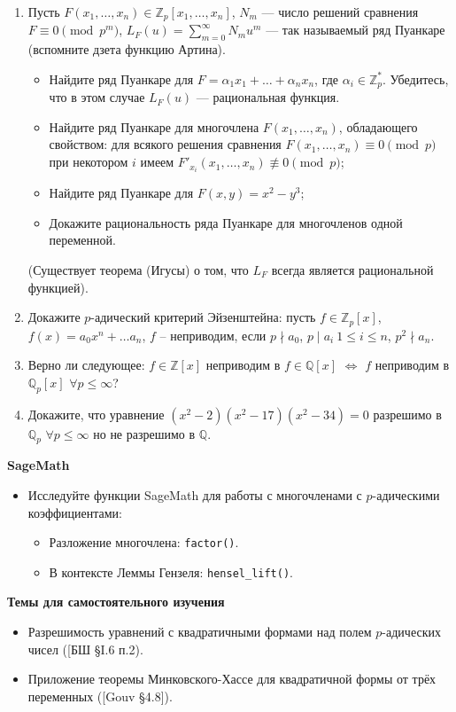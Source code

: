 \begin{enumerate}[topsep=0pt]
    \item Пусть $F(x_1,\dots, x_n) \in \mathbb{Z}_p[x_1,\dots, x_n]$, $N_m$ --- число решений сравнения $F \equiv 0 \pmod{p^m}$, $L_F(u) = \sum_{m=0}^\infty N_m u^m$ --- так называемый ряд Пуанкаре (вспомните дзета функцию Артина).
    \begin{itemize}[topsep=0pt]
        \item Найдите ряд Пуанкаре для $F = \alpha_1 x_1 + \dots + \alpha_n x_n$, где $\alpha_i \in \mathbb{Z}_p^*$. Убедитесь, что в этом случае $L_F(u)$ --- рациональная функция.
        \item Найдите ряд Пуанкаре для многочлена $F(x_1,\dots, x_n)$, обладающего свойством: для всякого решения сравнения $F(x_1,\dots, x_n) \equiv 0 \pmod{p}$ при некотором $i$ имеем $F'_{x_i}(x_1,\dots, x_n) \not\equiv 0 \pmod{p}$;
        \item Найдите ряд Пуанкаре для $F(x,y)=x^2-y^3$;
        \item Докажите рациональность ряда Пуанкаре для многочленов одной переменной. 
    \end{itemize}
    (Существует теорема (Игусы) о том, что $L_F$ всегда является рациональной функцией).

    \item Докажите $p$-адический критерий Эйзенштейна: пусть $f\in \mathbb{Z}_p[x]$, $f(x) = a_0 x^n+ \dots a_n$, $f$ -- неприводим, если $p \nmid a_0$, $p \mid a_i\ 1\leqslant i \leqslant n$, $p^2 \nmid a_n$.

    \item Верно ли следующее: $f\in \mathbb{Z}[x]$ неприводим в $f\in \mathbb{Q}[x]$ $\Leftrightarrow$ $f$ неприводим в $ \mathbb{Q}_p[x]$ $\forall p\leqslant\infty$? %

    \item Докажите, что уравнение $(x^2-2)(x^2-17)(x^2-34)=0$ разрешимо в $\mathbb{Q}_p$ $\forall p\leqslant \infty$ но не разрешимо в $\mathbb{Q}$.
  
\end{enumerate}

\noindent\textbf{SageMath}
\begin{itemize}[topsep=0pt]
    \item Исследуйте функции SageMath для работы с многочленами с $p$-адическими коэффициентами:
    \begin{itemize}[noitemsep,topsep=0pt]
        \item Разложение многочлена: \texttt{factor()}.
        \item В контексте Леммы Гензеля: \texttt{hensel\_lift()}.
    \end{itemize}
\end{itemize}

\noindent\textbf{Темы для самостоятельного изучения}
\begin{itemize}[topsep=0pt]
    \item Разрешимость уравнений с квадратичными формами над полем $p$-адических чисел ([БШ \S I.6 п.2).
    \item Приложение теоремы Минковского-Хассе для квадратичной формы от трёх переменных ([Gouv \S 4.8]).
\end{itemize}


